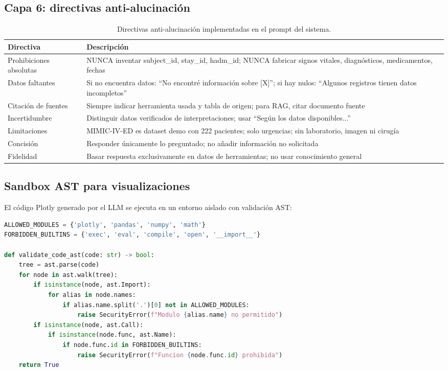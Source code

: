 \subsection{Capa 6: directivas anti-alucinación}

\begin{table}[H]
\centering
\caption{Directivas anti-alucinación implementadas en el prompt del sistema.}
\label{tab:appendix_antihallucination}
\footnotesize
\begin{tabularx}{\columnwidth}{lX}
\toprule
\textbf{Directiva} & \textbf{Descripción} \\
\midrule
Prohibiciones absolutas & NUNCA inventar subject\_id, stay\_id, hadm\_id; NUNCA fabricar signos vitales, diagnósticos, medicamentos, fechas \\
Datos faltantes & Si no encuentra datos: ``No encontré información sobre [X]''; si hay nulos: ``Algunos registros tienen datos incompletos'' \\
Citación de fuentes & Siempre indicar herramienta usada y tabla de origen; para \ac{RAG}, citar documento fuente \\
Incertidumbre & Distinguir datos verificados de interpretaciones; usar ``Según los datos disponibles...'' \\
Limitaciones & \acs{MIMIC}-IV-\acs{ED} es dataset demo con 222 pacientes; solo urgencias; sin laboratorio, imagen ni cirugía \\
Concisión & Responder únicamente lo preguntado; no añadir información no solicitada \\
Fidelidad & Basar respuesta exclusivamente en datos de herramientas; no usar conocimiento general \\
\bottomrule
\end{tabularx}
\end{table}

\subsection{Sandbox \acs{AST} para visualizaciones}

El código Plotly generado por el \ac{LLM} se ejecuta en un entorno aislado con validación \ac{AST}:

\begin{lstlisting}[language=Python, basicstyle=\tiny\ttfamily, backgroundcolor=\color{codebg}]
ALLOWED_MODULES = {'plotly', 'pandas', 'numpy', 'math'}
FORBIDDEN_BUILTINS = {'exec', 'eval', 'compile', 'open', '__import__'}

def validate_code_ast(code: str) -> bool:
    tree = ast.parse(code)
    for node in ast.walk(tree):
        if isinstance(node, ast.Import):
            for alias in node.names:
                if alias.name.split('.')[0] not in ALLOWED_MODULES:
                    raise SecurityError(f"Modulo {alias.name} no permitido")
        if isinstance(node, ast.Call):
            if isinstance(node.func, ast.Name):
                if node.func.id in FORBIDDEN_BUILTINS:
                    raise SecurityError(f"Funcion {node.func.id} prohibida")
    return True
\end{lstlisting}

